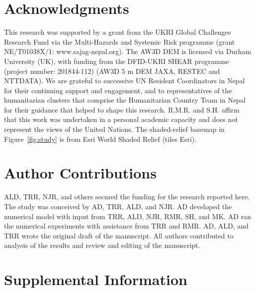 \documentclass[preprint,12pt,authoryear]{elsarticle}
\begin{document}
\section*{Acknowledgments}
This research was supported by a grant from the UKRI Global Challenges Research Fund via the Multi-Hazards and Systemic Risk programme (grant NE/T01038X/1: www.sajag-nepal.org). The AW3D DEM is licensed via Durham University (UK), with funding from the DFID-UKRI SHEAR programme (project number: 201844-112) (AW3D 5 m DEM \textcopyright JAXA, RESTEC and NTTDATA). We are grateful to successive UN Resident Coordinators in Nepal for their continuing support and engagement, and to representatives of the humanitarian clusters that comprise the Humanitarian Country Team in Nepal for their guidance that helped to shape this research. R.M.R. and S.H. affirm that this work was undertaken in a personal academic capacity and does not represent the views of the United Nations. The shaded-relief basemap in Figure~\ref{fig:study} is from Esri World Shaded Relief (tiles \textcopyright{} Esri).

\section*{Author Contributions}
ALD, TRR, NJR, and others secured the funding for the research reported here. The study was conceived by AD, TRR, ALD, and NJR. AD developed the numerical model with input from TRR, ALD, NJR, RMR, SH, and MK. AD ran the numerical experiments with assistance from TRR and RMR. AD, ALD, and TRR wrote the original draft of the manuscript. All authors contributed to analysis of the results and review and editing of the manuscript.



\clearpage
\appendix
\renewcommand{\thefigure}{S\arabic{figure}}
\setcounter{figure}{0}

\section*{Supplemental Information}
\end{document}
